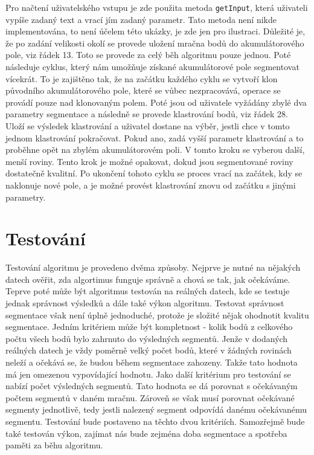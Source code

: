 \documentclass[11pt,twoside,a4paper]{book}
\begin{document}
Pro načtení uživatelského vstupu je zde použita metoda \verb|getInput|, která uživateli vypíše zadaný text a vrací jím zadaný parametr. Tato metoda není nikde implementována, to není účelem této ukázky, je zde jen pro ilustraci. Důležité je, že po zadání velikosti okolí se provede uložení mračna bodů do akumulátorového pole, viz řádek 13. Toto se provede za celý běh algoritmu pouze jednou.  Poté následuje cyklus, který nám umožňuje získané akumulátorové pole segmentovat vícekrát. To je zajištěno tak, že na začátku každého cyklu se vytvoří klon původního akumulátorového pole, které se vůbec nezpracovává, operace se provádí pouze nad klonovaným polem. Poté jsou od uživatele vyžádány zbylé dva parametry segmentace a následně se provede klastrování bodů, viz řádek 28. Uloží se výsledek klastrování a uživatel dostane na výběr, jestli chce v tomto jednom klastrování pokračovat. Pokud ano, zadá vyšší parametr klastrování a to proběhne opět na zbylém akumulátorovém poli. V tomto kroku se vyberou další, menší roviny. Tento krok je možné opakovat, dokud jsou segmentované roviny dostatečně kvalitní. Po ukončení tohoto cyklu se proces vrací na začátek, kdy se naklonuje nové pole, a je možné provést klastrování znovu od začátku s jinými parametry.


\chapter{Testování}
\label{chap:test}

Testování algoritmu je provedeno dvěma způsoby. Nejprve je nutné na nějakých  datech ověřit, zda algortimus funguje správně a chová se tak, jak očekáváme. Teprve poté může být algoritmus testován na reálných datech, kde se testuje jednak správnost výsledků a dále také výkon algoritmu. Testovat správnost segmentace však není úplně jednoduché, protože je složité nějak ohodnotit kvalitu segmentace. Jedním kritériem může být kompletnost - kolik bodů z celkového počtu všech bodů bylo zahrnuto do výsledných segmentů. Jenže v dodaných reálných datech je vždy poměrně velký počet bodů, které v žádných rovinách neleží a očekává se, že budou během segmentace zahozeny. Takže tato hodnota má jen omezenou vypovídající hodnotu. Jako další kritérium pro testování se nabízí počet výsledných segmentů. Tato hodnota se dá porovnat s očekávaným počtem segmentů v daném mračnu. Zároveň se však musí porovnat očekávané segmenty jednotlivě, tedy jestli nalezený segment odpovídá danému očekávanému segmentu. Testování bude postaveno na těchto dvou kritériích. Samozřejmě bude také testován výkon, zajímat nás bude zejména doba segmentace a spotřeba paměti za běhu algoritmu.
\end{document}
